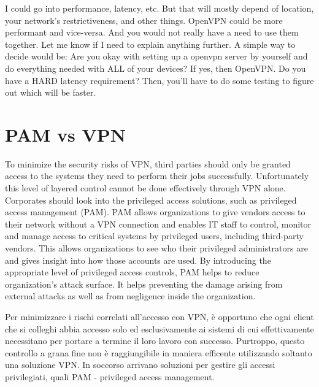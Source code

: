I could go into performance, latency, etc. But that will mostly depend of location, your network's restrictiveness, and other things. OpenVPN could be more performant and vice-versa.
And you would not really have a need to use them together. Let me know if I need to explain anything further. A simple way to decide would be:
Are you okay with setting up a openvpn server by yourself and do everything needed with ALL of your devices? If yes, then OpenVPN.
Do you have a HARD latency requirement? Then, you'll have to do some testing to figure out which will be faster.



\section{PAM vs VPN}
To minimize the security risks of VPN, third parties should only be granted access to the systems they need to perform their jobs successfully. Unfortunately this level of layered control cannot be done effectively through VPN alone. Corporates should look into the privileged access solutions, such as privileged access management (PAM). PAM allows organizations to give vendors access to their network without a VPN connection and enables IT staff to control, monitor and manage access to critical systems by privileged users, including third-party vendors. This allows organizations to see who their privileged administrators are and gives insight into how those accounts are used. By introducing the appropriate level of privileged access controls, PAM helps to reduce organization's attack surface. It helps preventing the damage arising from external attacks as well as from negligence inside the organization.

Per minimizzare i rischi correlati all'accesso con VPN, è opportuno che ogni client che si colleghi abbia accesso solo ed esclusivamente ai sistemi di cui effettivamente necessitano per portare a termine il loro lavoro con successo.
Purtroppo, questo controllo a grana fine non è raggiungibile in maniera efficente utilizzando soltanto una soluzione VPN. In soccorso arrivano soluzioni per gestire gli accessi privilegiati, quali PAM - privileged access management.

